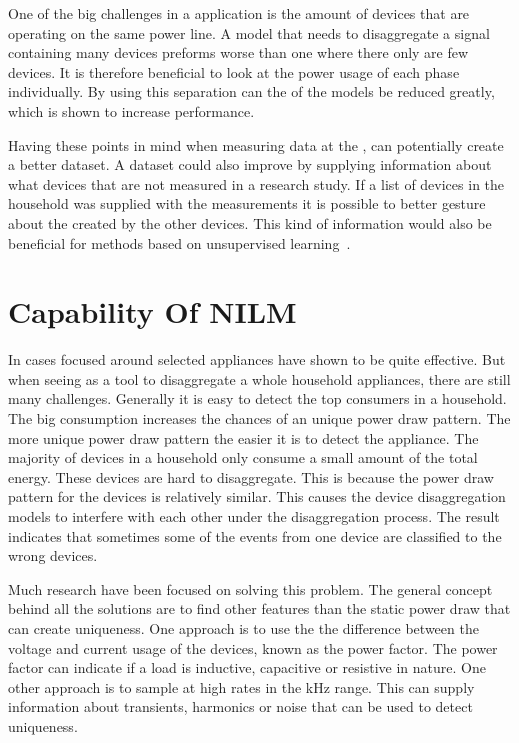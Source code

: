 One of the big challenges in a  application is the amount of devices that are operating on the same power line. A model that needs to disaggregate a signal containing many devices preforms worse than one where there only are few devices. It is therefore beneficial to look at the power usage of each phase individually. By using this separation can the  of the models be reduced greatly, which is shown to increase performance. 

Having these points in mind when measuring data at the , can potentially create a better dataset. A dataset could also improve by supplying information about what devices that are not measured in a research study. If a list of devices in the household was supplied with the measurements it is possible to better gesture about the  created by the other devices. This kind of information would also be beneficial for methods based on unsupervised learning~\citep{RefWorks:19}. 

\section{Capability Of NILM}
In cases focused around selected appliances have  shown to be quite effective. But when seeing  as a tool to disaggregate a whole household appliances, there are still many challenges. Generally it is easy to detect the top consumers in a household. The big consumption increases the chances of an unique power draw pattern. The more unique power draw pattern the easier it is to detect the appliance. The majority of devices in a household only consume a small amount of the total energy. These devices are hard to disaggregate. This is because the power draw pattern for the devices is relatively similar. This causes the device disaggregation models to interfere with each other under the disaggregation process. The result indicates that sometimes some of the events from one device are classified to the wrong devices. 

Much research have been focused on solving this problem. The general concept behind all the solutions are to find other features than the static power draw that can create uniqueness. One approach is to use the the difference between the voltage and current usage of the devices, known as the power factor. The power factor can indicate if a load is inductive, capacitive or resistive in nature. One other approach is to sample at high rates in the kHz range. This can supply information about transients, harmonics or noise that can be used to detect uniqueness.


